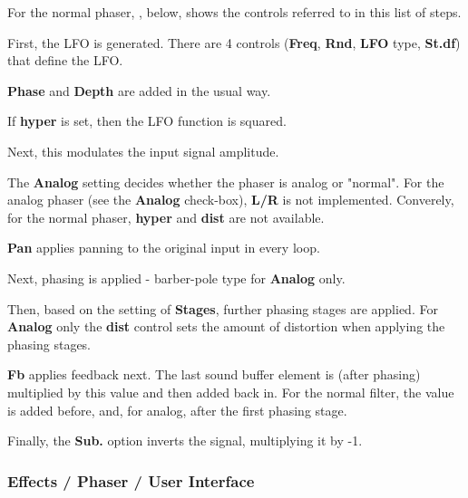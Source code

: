 
   For the normal phaser,
   , below, shows the controls referred to
   in this list of steps.

   \begin{enumber}
      \item First, the LFO is generated.
         There are 4 controls
         (\textbf{Freq}, \textbf{Rnd}, \textbf{LFO} type, \textbf{St.df})
         that define the LFO.
      \item \textbf{Phase} and \textbf{Depth} are added in the usual way.
      \item If \textbf{hyper} is set, then the LFO function is squared.
      \item Next, this modulates the input signal amplitude.
      \item The \textbf{Analog} setting decides whether the phaser is analog
            or "normal".
            For the analog phaser (see the \textbf{Analog} check-box),
            \textbf{L/R} is not implemented.
            Converely, for the normal phaser, \textbf{hyper} and \textbf{dist}
            are not available.
      \item \textbf{Pan} applies panning to the original input in every loop.
      \item Next, phasing is applied - barber-pole type for \textbf{Analog} only.
      \item Then, based on the setting of \textbf{Stages}, further phasing
            stages are applied.
            For \textbf{Analog} only the \textbf{dist} control sets the amount of
            distortion when applying the phasing stages.
      \item \textbf{Fb} applies feedback next. The last sound buffer element is (after
            phasing) multiplied by this value and then added back in. For the
            normal filter, the value is added before, and, for analog, after the
            first phasing stage.
      \item Finally, the \textbf{Sub.} option inverts the signal, multiplying it
            by -1.
   \end{enumber}

\subsubsection{Effects / Phaser / User Interface}
\label{subsubsec:effects_edit_phaser_ui}

